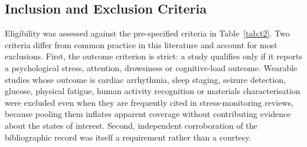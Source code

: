 \documentclass[11pt,a4paper]{article}
\begin{document}
\begin{table}[!htbp]
\centering
\caption{Composition of the screened corpus and inclusion yield by publisher of record.
Inclusion yield is the proportion of screened records from that publisher that met all
eligibility criteria.}
\label{tab:t1}
\small
{}
\end{table}

\subsection{Inclusion and Exclusion Criteria}
Eligibility was assessed against the pre-specified criteria in Table~\ref{tab:t2}. Two
criteria differ from common practice in this literature and account for most exclusions.
First, the outcome criterion is strict: a study qualifies only if it reports a psychological
stress, attention, drowsiness or cognitive-load outcome. Wearable studies whose outcome is
cardiac arrhythmia, sleep staging, seizure detection, glucose, physical fatigue, human
activity recognition or materials characterisation were excluded even when they are
frequently cited in stress-monitoring reviews, because pooling them inflates apparent
coverage without contributing evidence about the states of interest. Second, independent
corroboration of the bibliographic record was itself a requirement rather than a courtesy.
\end{document}
